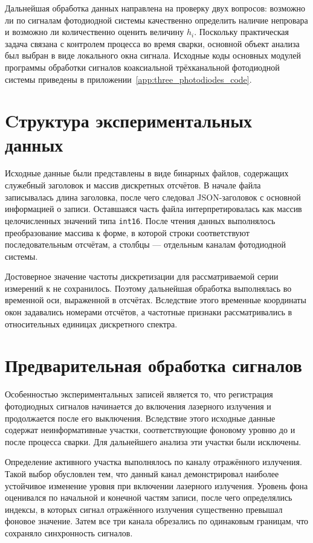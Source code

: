Дальнейшая обработка данных направлена на проверку двух вопросов: возможно ли по сигналам фотодиодной системы качественно определить наличие непровара и возможно ли количественно оценить величину \(h_i\). Поскольку практическая задача связана с контролем процесса во время сварки, основной объект анализа был выбран в виде локального окна сигнала. Исходные коды основных модулей программы обработки сигналов коаксиальной трёхканальной фотодиодной системы приведены в приложении~\ref{app:three_photodiodes_code}.

\section{Cтруктура экспериментальных данных}

Исходные данные были представлены в виде бинарных файлов, содержащих служебный заголовок и массив дискретных отсчётов. В начале файла записывалась длина заголовка, после чего следовал JSON-заголовок с основной информацией о записи. Оставшаяся часть файла интерпретировалась как массив целочисленных значений типа \texttt{int16}. После чтения данных выполнялось преобразование массива к форме, в которой строки соответствуют последовательным отсчётам, а столбцы --- отдельным каналам фотодиодной системы.

Достоверное значение частоты дискретизации для рассматриваемой серии измерений к не сохранилось. Поэтому дальнейшая обработка выполнялась во временной оси, выраженной в отсчётах. Вследствие этого временные координаты окон задавались номерами отсчётов, а частотные признаки рассматривались в относительных единицах дискретного спектра.

\section{Предварительная обработка сигналов}

Особенностью экспериментальных записей является то, что регистрация фотодиодных сигналов начинается до включения лазерного излучения и продолжается после его выключения. Вследствие этого исходные данные содержат неинформативные участки, соответствующие фоновому уровню до и после процесса сварки. Для дальнейшего анализа эти участки были исключены.

Определение активного участка выполнялось по каналу отражённого излучения. Такой выбор обусловлен тем, что данный канал демонстрировал наиболее устойчивое изменение уровня при включении лазерного излучения. Уровень фона оценивался по начальной и конечной частям записи, после чего определялись индексы, в которых сигнал отражённого излучения существенно превышал фоновое значение. Затем все три канала обрезались по одинаковым границам, что сохраняло синхронность сигналов.

